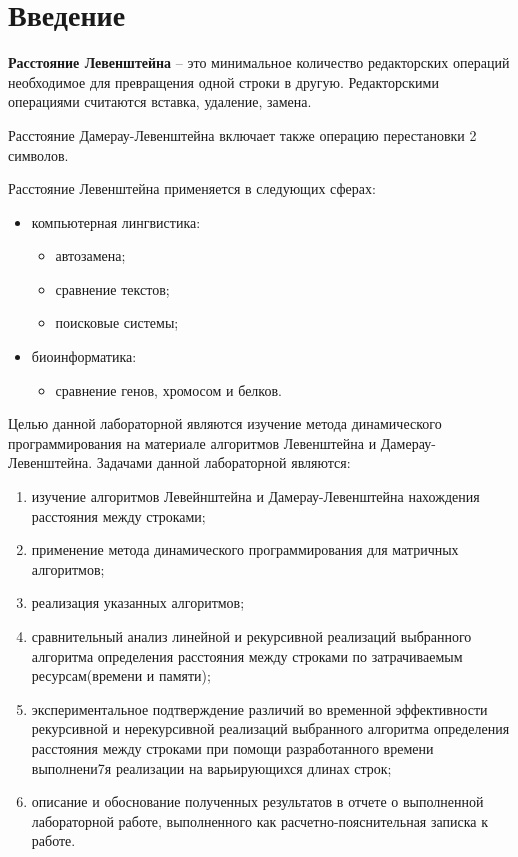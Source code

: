 \chapter*{Введение}\label{Input}

\textbf{Расстояние Левенштейна} -- это минимальное количество редакторских операций необходимое для 
превращения одной строки в другую. Редакторскими операциями считаются вставка, удаление, замена.

Расстояние Дамерау-Левенштейна включает также операцию перестановки 2 символов.

Расстояние Левенштейна применяется в следующих сферах:
\begin{itemize}
  \item компьютерная лингвистика:
  \begin{itemize}
    \item автозамена;
    \item сравнение текстов;
    \item поисковые системы;
  \end{itemize}
  \item биоинформатика:
  \begin{itemize}
    \item сравнение генов, хромосом и белков.
  \end{itemize}
\end{itemize}


Целью данной лабораторной являются изучение метода динамического программирования на материале алгоритмов Левенштейна и Дамерау-Левенштейна.
Задачами данной лабораторной являются:
\begin{enumerate}
  \item изучение алгоритмов Левейнштейна и Дамерау-Левенштейна нахождения расстояния между строками;
  \item применение метода динамического программирования для матричных алгоритмов;
  \item реализация указанных алгоритмов;
  \item сравнительный анализ линейной и рекурсивной реализаций выбранного алгоритма определения расстояния между строками по затрачиваемым 
        ресурсам(времени и памяти);
  \item экспериментальное подтверждение различий во временной эффективности рекурсивной и нерекурсивной реализаций выбранного алгоритма 
        определения расстояния между строками при помощи разработанного времени выполнени7я реализации на варьирующихся длинах строк;
  \item описание и обоснование полученных результатов в отчете о выполненной лабораторной работе, выполненного как расчетно-пояснительная 
        записка к работе.
\end{enumerate}

